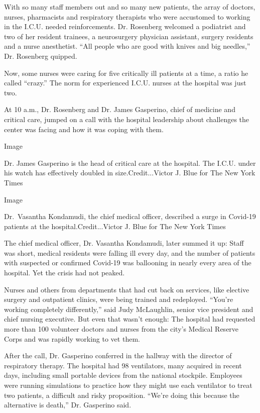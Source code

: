 With so many staff members out and so many new patients, the array of
doctors, nurses, pharmacists and respiratory therapists who were
accustomed to working in the I.C.U. needed reinforcements. Dr. Rosenberg
welcomed a podiatrist and two of her resident trainees, a neurosurgery
physician assistant, surgery residents and a nurse anesthetist. ``All
people who are good with knives and big needles,'' Dr. Rosenberg
quipped.

Now, some nurses were caring for five critically ill patients at a time,
a ratio he called ``crazy.'' The norm for experienced I.C.U. nurses at
the hospital was just two.

At 10 a.m., Dr. Rosenberg and Dr. James Gasperino, chief of medicine and
critical care, jumped on a call with the hospital leadership about
challenges the center was facing and how it was coping with them.

Image

Dr. James Gasperino is the head of critical care at the hospital. The
I.C.U. under his watch has effectively doubled in size.Credit...Victor
J. Blue for The New York Times

Image

Dr.~Vasantha Kondamudi, the chief medical officer, described a surge in
Covid-19 patients at the hospital.Credit...Victor J. Blue for The New
York Times

The chief medical officer, Dr. Vasantha Kondamudi, later summed it up:
Staff was short, medical residents were falling ill every day, and the
number of patients with suspected or confirmed Covid-19 was ballooning
in nearly every area of the hospital. Yet the crisis had not peaked.

Nurses and others from departments that had cut back on services, like
elective surgery and outpatient clinics, were being trained and
redeployed. ``You're working completely differently,'' said Judy
McLaughlin, senior vice president and chief nursing executive. But even
that wasn't enough: The hospital had requested more than 100 volunteer
doctors and nurses from the city's Medical Reserve Corps and was rapidly
working to vet them.

After the call, Dr. Gasperino conferred in the hallway with the director
of respiratory therapy. The hospital had 98 ventilators, many acquired
in recent days, including small portable devices from the national
stockpile. Employees were running simulations to practice how they might
use each ventilator to treat two patients, a difficult and risky
proposition. ``We're doing this because the alternative is death,'' Dr.
Gasperino said.

